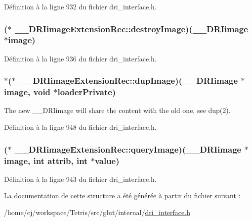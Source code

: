 Définition à la ligne 932 du fichier dri\-\_\-interface.\-h.

\hypertarget{struct_____d_r_iimage_extension_rec_a75984079230a666b2ac73aa524bc8b42}{
\subsubsection[{destroy\-Image}]{($\ast$ \-\_\-\-\_\-\-D\-R\-Iimage\-Extension\-Rec\-::destroy\-Image)({\bf \-\_\-\-\_\-\-D\-R\-Iimage} $\ast${\bf image})}}\label{struct_____d_r_iimage_extension_rec_a75984079230a666b2ac73aa524bc8b42}


Définition à la ligne 936 du fichier dri\-\_\-interface.\-h.

\hypertarget{struct_____d_r_iimage_extension_rec_aeb494b3de5da389667aafbb419a042db}{
\subsubsection[{dup\-Image}]{$\ast$($\ast$ \-\_\-\-\_\-\-D\-R\-Iimage\-Extension\-Rec\-::dup\-Image)({\bf \-\_\-\-\_\-\-D\-R\-Iimage} $\ast${\bf image}, {\bf void} $\ast$loader\-Private)}}\label{struct_____d_r_iimage_extension_rec_aeb494b3de5da389667aafbb419a042db}
The new \-\_\-\-\_\-\-D\-R\-Iimage will share the content with the old one, see dup(2). 

Définition à la ligne 948 du fichier dri\-\_\-interface.\-h.

\hypertarget{struct_____d_r_iimage_extension_rec_affe29b8a48fe33406f6a5a971e47ffef}{
\subsubsection[{query\-Image}]{($\ast$ \-\_\-\-\_\-\-D\-R\-Iimage\-Extension\-Rec\-::query\-Image)({\bf \-\_\-\-\_\-\-D\-R\-Iimage} $\ast${\bf image}, int attrib, int $\ast${\bf value})}}\label{struct_____d_r_iimage_extension_rec_affe29b8a48fe33406f6a5a971e47ffef}


Définition à la ligne 943 du fichier dri\-\_\-interface.\-h.



La documentation de cette structure a été générée à partir du fichier suivant \-:\begin{DoxyCompactItemize}
\item 
/home/cj/workspace/\-Tetris/src/glut/internal/\hyperlink{dri__interface_8h}{dri\-\_\-interface.\-h}\end{DoxyCompactItemize}
